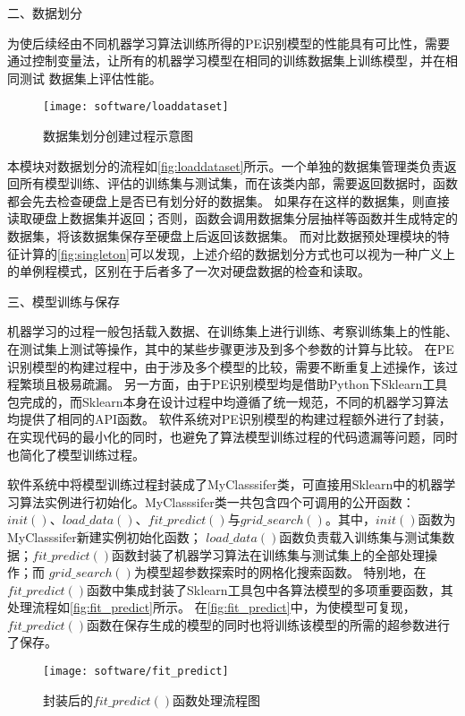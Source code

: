 二、数据划分

为使后续经由不同机器学习算法训练所得的PE识别模型的性能具有可比性，需要通过控制变量法，让所有的机器学习模型在相同的训练数据集上训练模型，并在相同测试
数据集上评估性能。
\begin{figure}[htbp]
    \centering
    \texttt{[image: software/loaddataset]}
    \caption{\label{fig:loaddataset}数据集划分创建过程示意图}
\end{figure}

本模块对数据划分的流程如\autoref{fig:loaddataset}所示。一个单独的数据集管理类负责返回所有模型训练、评估的训练集与测试集，而在该类内部，需要返回数据时，函数都会先去检查硬盘上是否已有划分好的数据集。
如果存在这样的数据集，则直接读取硬盘上数据集并返回；否则，函数会调用数据集分层抽样等函数并生成特定的数据集，将该数据集保存至硬盘上后返回该数据集。
而对比数据预处理模块的特征计算的\autoref{fig:singleton}可以发现，上述介绍的数据划分方式也可以视为一种广义上的单例程模式，区别在于后者多了一次对硬盘数据的检查和读取。

三、模型训练与保存

机器学习的过程一般包括载入数据、在训练集上进行训练、考察训练集上的性能、在测试集上测试等操作，其中的某些步骤更涉及到多个参数的计算与比较。
在PE识别模型的构建过程中，由于涉及多个模型的比较，需要不断重复上述操作，该过程繁琐且极易疏漏。
另一方面，由于PE识别模型均是借助Python下Sklearn工具包完成的，而Sklearn本身在设计过程中均遵循了统一规范，不同的机器学习算法均提供了相同的API函数。
软件系统对PE识别模型的构建过程额外进行了封装，在实现代码的最小化的同时，也避免了算法模型训练过程的代码遗漏等问题，同时也简化了模型训练过程。

软件系统中将模型训练过程封装成了MyClasssifer类，可直接用Sklearn中的机器学习算法实例进行初始化。MyClasssifer类一共包含四个可调用的公开函数：
$init()$、$load\_data()$、$fit\_predict()$与$grid\_search()$。其中，$init()$函数为MyClasssifer新建实例初始化函数；
$load\_data()$函数负责载入训练集与测试集数据；$fit\_predict()$函数封装了机器学习算法在训练集与测试集上的全部处理操作；而
$grid\_search()$为模型超参数探索时的网格化搜索函数。
特别地，在$fit\_predict()$函数中集成封装了Sklearn工具包中各算法模型的多项重要函数，其处理流程如\autoref{fig:fit_predict}所示。
在\autoref{fig:fit_predict}中，为使模型可复现，$fit\_predict()$函数在保存生成的模型的同时也将训练该模型的所需的超参数进行了保存。

\begin{figure}[ht]
    \centering
    \texttt{[image: software/fit\_predict]}
    \caption{\label{fig:fit_predict}封装后的$fit\_predict()$函数处理流程图}
\end{figure}

